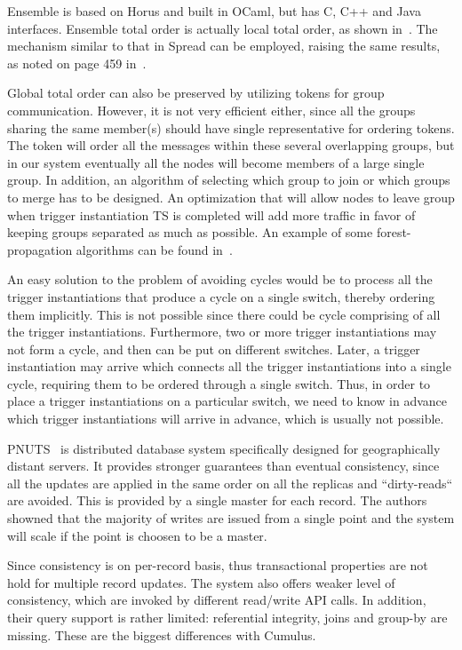 \documentclass{sig-semester}
\begin{document}
Ensemble is based on Horus and built in OCaml, but has C, C++ and Java interfaces. Ensemble total order is actually local total order, as shown in~\cite{hickey99}. The mechanism similar to that in Spread can be employed, raising the same results, as noted on page 459 in~\cite{Birman06}.

Global total order can also be preserved by utilizing tokens for group communication. However, it is not very efficient either, since all the groups sharing the same member(s) should have single representative for ordering tokens. The token will order all the messages within these several overlapping groups, but in our system eventually all the nodes will become members of a large single group. In addition, an algorithm of selecting which group to join or which groups to merge has to be designed. An optimization that will allow nodes to leave group when trigger instantiation TS is completed will add more traffic in favor of keeping groups separated as much as possible. An example of some forest-propagation algorithms can be found in~\cite{Garcia91}.

An easy solution to the problem of avoiding cycles would be to process all the trigger instantiations that produce a cycle on a single switch, thereby ordering them implicitly. This is not possible since there could be cycle comprising of all the trigger instantiations. Furthermore, two or more trigger instantiations may not form a cycle, and then can be put on different switches. Later, a trigger instantiation may arrive which connects all the trigger instantiations into a single cycle, requiring them to be ordered through a single switch. Thus, in order to place a trigger instantiations on a particular switch, we need to know in advance which trigger instantiations will arrive in advance, which is usually not possible.

PNUTS~\cite{cooper08} is distributed database system specifically designed for geographically distant servers. It provides stronger guarantees than eventual consistency, since all the updates are applied in the same order on all the replicas and ``dirty-reads`` are avoided. This is provided by a single master for each record. The authors showned that the majority of writes are issued from a single point and the system will scale if the point is choosen to be a master. 

Since consistency is on per-record basis, thus transactional properties are not hold for multiple record updates. The system also offers weaker level of consistency, which are invoked by different read/write API calls. In addition, their query support is rather limited: referential integrity, joins and group-by are missing. These are the biggest differences with Cumulus.
\end{document}
